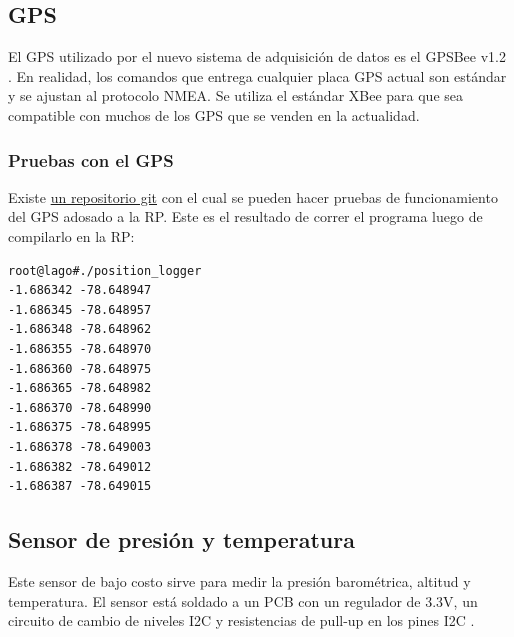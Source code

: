 \documentclass[a4paper,11pt]{article}
\begin{document}
\subsection{GPS}
El GPS utilizado por el nuevo sistema de adquisición de datos es el GPSBee v1.2
\cite{bibGPSBee}.
En realidad, los comandos que entrega cualquier placa GPS actual son estándar y
se ajustan al protocolo NMEA. 
Se utiliza el estándar XBee para que sea compatible con muchos de los GPS que se
venden en la actualidad.


\subsubsection{Pruebas con el GPS}
Existe \href{https://github.com/lagoprojectrp/rp\_venusGps}{un repositorio
git} con el cual se pueden hacer pruebas de funcionamiento del GPS adosado a la
RP. Este es el resultado de correr el programa luego de compilarlo en la RP:
\begin{verbatim}
root@lago#./position_logger
-1.686342 -78.648947
-1.686345 -78.648957
-1.686348 -78.648962
-1.686355 -78.648970
-1.686360 -78.648975
-1.686365 -78.648982
-1.686370 -78.648990
-1.686375 -78.648995
-1.686378 -78.649003
-1.686382 -78.649012
-1.686387 -78.649015
\end{verbatim}

\subsection{Sensor de presión y temperatura}


Este sensor de bajo costo sirve para medir la presión barométrica, altitud y
temperatura. El sensor está soldado a un PCB con un regulador de 3.3V, un
circuito de cambio de niveles I2C y resistencias de pull-up en los pines I2C
\cite{bibBMP180}.
\end{document}
